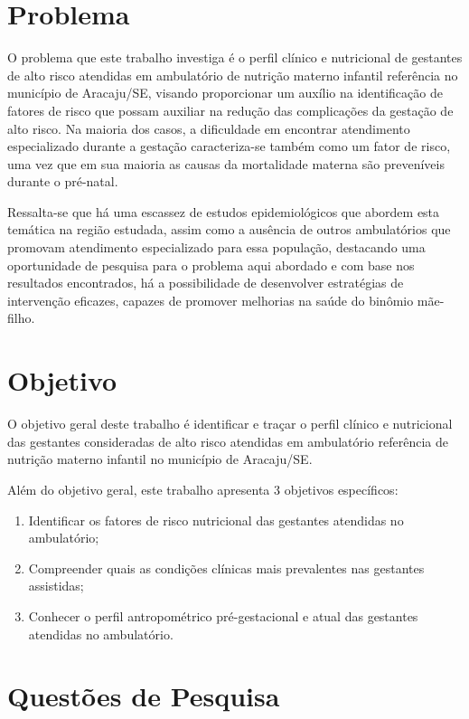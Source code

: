 \section{Problema}\label{sec:intro:problema}
O problema que este trabalho investiga é o perfil clínico e nutricional de gestantes de alto risco atendidas em ambulatório de nutrição materno infantil referência no município de Aracaju/SE, visando proporcionar um auxílio na identificação de fatores de risco que possam auxiliar na redução das complicações da gestação de alto risco. Na maioria dos casos, a dificuldade em encontrar atendimento especializado durante a gestação caracteriza-se também como um fator de risco, uma vez que em sua maioria as causas da mortalidade materna são preveníveis durante o pré-natal.

Ressalta-se que há uma escassez de estudos epidemiológicos que abordem esta temática na região estudada, assim como a ausência de outros ambulatórios que promovam atendimento especializado para essa população, destacando uma oportunidade de pesquisa para o problema aqui abordado e com base nos resultados encontrados, há a possibilidade de desenvolver estratégias de intervenção eficazes, capazes de promover melhorias na saúde do binômio mãe-filho. 

\section{Objetivo}
O objetivo geral deste trabalho é identificar e traçar o  perfil clínico e nutricional das gestantes consideradas de alto risco atendidas em ambulatório referência de nutrição materno infantil no município de Aracaju/SE. 

Além do objetivo geral, este trabalho apresenta 3 objetivos específicos:

\begin{enumerate}[label=\textbf{{OE}{\arabic*}}:,itemindent=1em,leftmargin=3.5em]
    \item{Identificar os fatores de risco nutricional das gestantes atendidas no ambulatório;}
    \item{Compreender quais as condições clínicas mais prevalentes nas gestantes assistidas;}
    \item{Conhecer o perfil antropométrico pré-gestacional e atual das gestantes atendidas no ambulatório.}
\end{enumerate}

\section{Questões de Pesquisa}\label{sec:intro:questoes-pesquisa}


